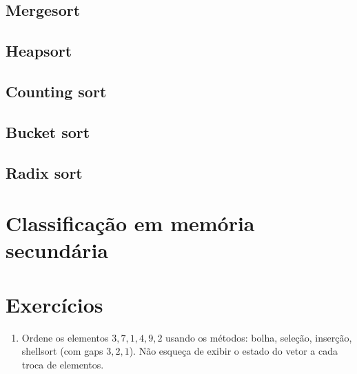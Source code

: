 \subsection{Mergesort}

\subsection{Heapsort}

\subsection{Counting sort}

\subsection{Bucket sort}

\subsection{Radix sort}

\section{Classificação em memória secundária}

\section{Exercícios}

\begin{enumerate}
\item Ordene os elementos $3, 7, 1, 4, 9, 2$ usando os métodos: bolha, seleção,
inserção, shellsort (com gaps $3, 2, 1$). Não esqueça de exibir o estado do vetor a cada troca
de elementos.
\end{enumerate}
